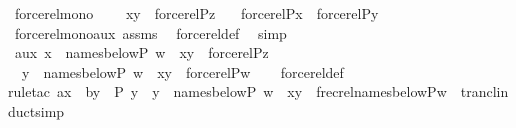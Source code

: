 \begin{isabellebody}
\endisatagproof
{\isafoldproof}%
%
\isadelimproof
\isanewline
%
\endisadelimproof
\isanewline
{}\isamarkupfalse%
\ forcerel{\isacharunderscore}{\kern0pt}mono\ {\isacharcolon}{\kern0pt}\isanewline
\ \ \ {\isachardoublequoteopen}{\isasymlangle}x{\isacharcomma}{\kern0pt}y{\isasymrangle}\ {\isasymin}\ forcerel{\isacharparenleft}{\kern0pt}P{\isacharcomma}{\kern0pt}z{\isacharparenright}{\kern0pt}{\isachardoublequoteclose}\isanewline
\ \ \ {\isachardoublequoteopen}forcerel{\isacharparenleft}{\kern0pt}P{\isacharcomma}{\kern0pt}x{\isacharparenright}{\kern0pt}\ {\isasymsubseteq}\ forcerel{\isacharparenleft}{\kern0pt}P{\isacharcomma}{\kern0pt}y{\isacharparenright}{\kern0pt}{\isachardoublequoteclose}\isanewline
%
\isadelimproof
\ \ %
\endisadelimproof
%
\isatagproof
{}\isamarkupfalse%
\ forcerel{\isacharunderscore}{\kern0pt}mono{\isacharunderscore}{\kern0pt}aux\ assms\ \isamarkupfalse%
\ forcerel{\isacharunderscore}{\kern0pt}def\ \isamarkupfalse%
\ simp%
\endisatagproof
{\isafoldproof}%
%
\isadelimproof
\isanewline
%
\endisadelimproof
\isanewline
{}\isamarkupfalse%
\ aux{\isacharcolon}{\kern0pt}\ {\isachardoublequoteopen}x\ {\isasymin}\ names{\isacharunderscore}{\kern0pt}below{\isacharparenleft}{\kern0pt}P{\isacharcomma}{\kern0pt}\ w{\isacharparenright}{\kern0pt}\ {\isasymLongrightarrow}\ {\isasymlangle}x{\isacharcomma}{\kern0pt}y{\isasymrangle}\ {\isasymin}\ forcerel{\isacharparenleft}{\kern0pt}P{\isacharcomma}{\kern0pt}z{\isacharparenright}{\kern0pt}\ {\isasymLongrightarrow}\isanewline
\ \ {\isacharparenleft}{\kern0pt}y\ {\isasymin}\ names{\isacharunderscore}{\kern0pt}below{\isacharparenleft}{\kern0pt}P{\isacharcomma}{\kern0pt}\ w{\isacharparenright}{\kern0pt}\ {\isasymlongrightarrow}\ {\isasymlangle}x{\isacharcomma}{\kern0pt}y{\isasymrangle}\ {\isasymin}\ forcerel{\isacharparenleft}{\kern0pt}P{\isacharcomma}{\kern0pt}w{\isacharparenright}{\kern0pt}{\isacharparenright}{\kern0pt}{\isachardoublequoteclose}\isanewline
%
\isadelimproof
\ \ %
\endisadelimproof
%
\isatagproof
{}\isamarkupfalse%
\ forcerel{\isacharunderscore}{\kern0pt}def\isanewline
{}\isamarkupfalse%
{\isacharparenleft}{\kern0pt}rule{\isacharunderscore}{\kern0pt}tac\ a{\isacharequal}{\kern0pt}x\ \ b{\isacharequal}{\kern0pt}y\ \ P{\isacharequal}{\kern0pt}{\isachardoublequoteopen}{\isasymlambda}\ y\ {\isachardot}{\kern0pt}\ y\ {\isasymin}\ names{\isacharunderscore}{\kern0pt}below{\isacharparenleft}{\kern0pt}P{\isacharcomma}{\kern0pt}\ w{\isacharparenright}{\kern0pt}\ {\isasymlongrightarrow}\ {\isasymlangle}x{\isacharcomma}{\kern0pt}y{\isasymrangle}\ {\isasymin}\ frecrel{\isacharparenleft}{\kern0pt}names{\isacharunderscore}{\kern0pt}below{\isacharparenleft}{\kern0pt}P{\isacharcomma}{\kern0pt}w{\isacharparenright}{\kern0pt}{\isacharparenright}{\kern0pt}{\isacharcircum}{\kern0pt}{\isacharplus}{\kern0pt}{\isachardoublequoteclose}\ \ trancl{\isacharunderscore}{\kern0pt}induct{\isacharcomma}{\kern0pt}simp{\isacharparenright}{\kern0pt}\isanewline

\end{isabellebody}

